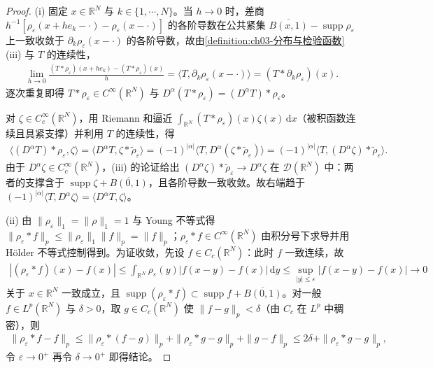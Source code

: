 \documentclass[../../main.tex]{subfiles}%
\begin{document}
\begin{proof}
(i) 固定 $x\in\mathbb{R}^N$ 与 $k\in\{1,\cdots ,N\}$。当 $h\to0$ 时，差商 $h^{-1}[\rho_\varepsilon(x+he_k-\cdot)-\rho_\varepsilon(x-\cdot)]$ 的各阶导数在公共紧集 $\overline{B(x,1)}-\operatorname{supp}\rho_\varepsilon$ 上一致收敛于 $\partial_k\rho_\varepsilon(x-\cdot)$ 的各阶导数，故由\cref{definition:ch03-分布与检验函数}(iii) 与 $T$ 的连续性，
\begin{align*}
\lim_{h\to0}\frac{(T*\rho_\varepsilon)(x+he_k)-(T*\rho_\varepsilon)(x)}{h}=\langle T,\partial_k\rho_\varepsilon(x-\cdot)\rangle=(T*\partial_k\rho_\varepsilon)(x).
\end{align*}
逐次重复即得 $T*\rho_\varepsilon\in C^\infty(\mathbb{R}^N)$ 与 $D^\alpha(T*\rho_\varepsilon)=(D^\alpha T)*\rho_\varepsilon$。

对 $\zeta\in C^\infty_c(\mathbb{R}^N)$，用 Riemann 和逼近 $\int_{\mathbb{R}^N}(T*\rho_\varepsilon)(x)\zeta(x)\,\mathrm{d}x$（被积函数连续且具紧支撑）并利用 $T$ 的连续性，得
\begin{align*}
\langle (D^\alpha T)*\rho_\varepsilon,\zeta\rangle
=\langle D^\alpha T,\zeta*\widetilde\rho_\varepsilon\rangle
=(-1)^{|\alpha|}\langle T,D^\alpha(\zeta*\widetilde\rho_\varepsilon)\rangle
=(-1)^{|\alpha|}\langle T,(D^\alpha\zeta)*\widetilde\rho_\varepsilon\rangle.
\end{align*}
由于 $D^\alpha\zeta\in C^\infty_c(\mathbb{R}^N)$，(iii) 的论证给出 $(D^\alpha\zeta)*\widetilde\rho_\varepsilon\to D^\alpha\zeta$ 在 $\mathcal{D}(\mathbb{R}^N)$ 中：两者的支撑含于 $\operatorname{supp}\zeta+\overline{B(0,1)}$，且各阶导数一致收敛。故右端趋于 $(-1)^{|\alpha|}\langle T,D^\alpha\zeta\rangle=\langle D^\alpha T,\zeta\rangle$。

(ii) 由 $\|\rho_\varepsilon\|_1=\|\rho\|_1=1$ 与 Young 不等式得 $\|\rho_\varepsilon*f\|_p\leqslant\|\rho_\varepsilon\|_1\|f\|_p=\|f\|_p$；$\rho_\varepsilon*f\in C^\infty(\mathbb{R}^N)$ 由积分号下求导并用 Hölder 不等式控制得到。为证收敛，先设 $f\in C_c(\mathbb{R}^N)$：此时 $f$ 一致连续，故
\begin{align*}
|(\rho_\varepsilon*f)(x)-f(x)|\leqslant\int_{\mathbb{R}^N}\rho_\varepsilon(y)|f(x-y)-f(x)|\,\mathrm{d}y\leqslant\sup_{|y|\leqslant\varepsilon}|f(x-y)-f(x)|\to0
\end{align*}
关于 $x\in\mathbb{R}^N$ 一致成立，且 $\operatorname{supp}(\rho_\varepsilon*f)\subset\operatorname{supp}f+\overline{B(0,1)}$。对一般 $f\in L^p(\mathbb{R}^N)$ 与 $\delta>0$，取 $g\in C_c(\mathbb{R}^N)$ 使 $\|f-g\|_p<\delta$（由 $C_c$ 在 $L^p$ 中稠密），则
\begin{align*}
\|\rho_\varepsilon*f-f\|_p\leqslant\|\rho_\varepsilon*(f-g)\|_p+\|\rho_\varepsilon*g-g\|_p+\|g-f\|_p\leqslant 2\delta+\|\rho_\varepsilon*g-g\|_p,
\end{align*}
令 $\varepsilon\to0^+$ 再令 $\delta\to0^+$ 即得结论。


\end{proof}
\end{document}
